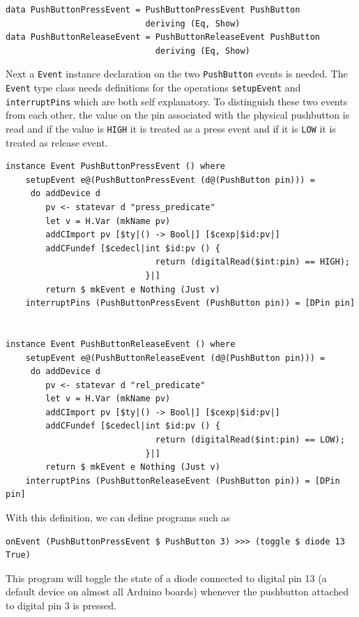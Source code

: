 \documentclass[a4paper, oneside, final]{memoir}
\begin{document}
\begin{verbatim}
data PushButtonPressEvent = PushButtonPressEvent PushButton
                            deriving (Eq, Show)
data PushButtonReleaseEvent = PushButtonReleaseEvent PushButton
                              deriving (Eq, Show)
\end{verbatim}

\noindent
Next a \texttt{Event} instance declaration on the two \texttt{PushButton} events
is needed. The \texttt{Event} type class needs definitions for the operations
\texttt{setupEvent} and \texttt{interruptPins} which are both self
explanatory. To distinguish these two events from each other, the value on the
pin associated with the physical pushbutton is read and if the value is
\texttt{HIGH} it is treated as a press event and if it is \texttt{LOW} it is
treated as release event.

\begin{verbatim}
instance Event PushButtonPressEvent () where
    setupEvent e@(PushButtonPressEvent (d@(PushButton pin))) = 
     do addDevice d
        pv <- statevar d "press_predicate" 
        let v = H.Var (mkName pv)
        addCImport pv [$ty|() -> Bool|] [$cexp|$id:pv|]
        addCFundef [$cedecl|int $id:pv () {
                              return (digitalRead($int:pin) == HIGH);
                            }|]
        return $ mkEvent e Nothing (Just v)
    interruptPins (PushButtonPressEvent (PushButton pin)) = [DPin pin]


instance Event PushButtonReleaseEvent () where
    setupEvent e@(PushButtonReleaseEvent (d@(PushButton pin))) = 
     do addDevice d 
        pv <- statevar d "rel_predicate" 
        let v = H.Var (mkName pv)
        addCImport pv [$ty|() -> Bool|] [$cexp|$id:pv|]
        addCFundef [$cedecl|int $id:pv () {
                              return (digitalRead($int:pin) == LOW);
                            }|]
        return $ mkEvent e Nothing (Just v)
    interruptPins (PushButtonReleaseEvent (PushButton pin)) = [DPin pin]
\end{verbatim}

With this definition, we can define programs such as

\begin{verbatim}
onEvent (PushButtonPressEvent $ PushButton 3) >>> (toggle $ diode 13 True)
\end{verbatim}

This program will toggle the state of a diode connected to digital pin
13 (a default device on almost all Arduino boards) whenever the
pushbutton attached to digital pin 3 is pressed.
\end{document}
